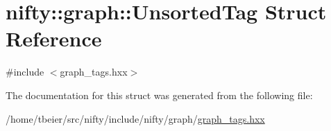 \hypertarget{structnifty_1_1graph_1_1UnsortedTag}{}\section{nifty\+:\+:graph\+:\+:Unsorted\+Tag Struct Reference}
\label{structnifty_1_1graph_1_1UnsortedTag}


{\ttfamily \#include $<$graph\+\_\+tags.\+hxx$>$}



The documentation for this struct was generated from the following file\+:\begin{DoxyCompactItemize}
\item 
/home/tbeier/src/nifty/include/nifty/graph/\hyperlink{graph__tags_8hxx}{graph\+\_\+tags.\+hxx}\end{DoxyCompactItemize}
